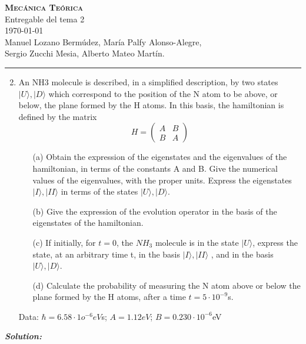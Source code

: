 \documentclass{article}
\begin{document}
\begin{center}
   \HUGE\textbf{ \scshape Mecánica Teórica}  \\ \huge Entregable del tema 2 \\ \vspace{0.5cm}\today \\
   \vspace{0.7cm}
   \large Manuel Lozano Bermúdez, María Palfy Alonso-Alegre, \\ Sergio Zucchi Mesia,  Alberto Mateo Martín.\\ \rule{\textwidth}{2pt} 
\end{center}

\begin{mybox}
        \begin{enumerate}
        \setcounter{enumi}{1}
        \item An NH3 molecule is described, in a simplified description, by two states $|U\rangle, |D\rangle$ which correspond to the position of the N atom to be above, or below, the plane formed by the H atoms. In this basis, the hamiltonian is defined by the matrix
        $$
        H=      \begin{pmatrix}
                    A & B\\
                    B & A
                \end{pmatrix}
        $$
            \begin{itemize}
                \item[(a)] Obtain the expression of the eigenstates and the eigenvalues of the hamiltonian, in terms of the constants A and B. Give the numerical values of the eigenvalues, with the proper units. Express the eigenstates $|I\rangle, |II\rangle$ in terms of the states $|U\rangle, |D\rangle$.
                \item[(b)] Give the expression of the evolution operator in the basis of the eigenstates of the hamiltonian.
                \item[(c)] If initially, for $t = 0$, the $NH_3$ molecule is in the state $|U\rangle$, express the state, at an arbitrary time t, in the basis $|I\rangle, |II\rangle$ , and in the basis $|U\rangle, |D\rangle$.
                \item[(d)] Calculate the probability of measuring the N atom above or below the plane formed by the H atoms, after a time $t = 5\cdot 10^{-9} $s.
            \end{itemize}
        Data: $\hbar = 6.58 \cdot 1o^{-6} eV $s; $A=1.12eV$; $B=0.230 \cdot10^{-6}$eV
        \end{enumerate}
\end{mybox}
\emph{\bfseries Solution:} \\
\end{document}
